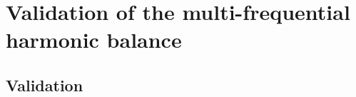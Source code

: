 \chapter{Validation of the multi-frequential harmonic balance}
\label{cha:validation_multi_freq}

\chabstract{}

\minitoc
\newpage



\section{Validation}
\label{sec:channel_multifreq}


\chconclu{}
